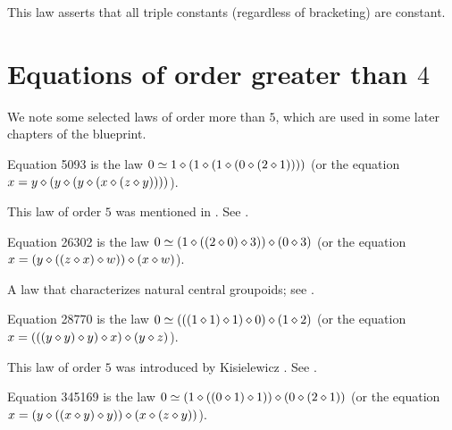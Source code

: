 This law asserts that all triple constants (regardless of bracketing) are constant.

\section{Equations of order greater than \texorpdfstring{$4$}{4}}

We note some selected laws of order more than $5$, which are used in some later chapters of the blueprint.

\begin{definition}[Equation 5093]
  \label{eq5093}\leanok
  Equation 5093 is the law $0  \simeq 1 \diamond (1 \diamond (1 \diamond (0 \diamond (2 \diamond 1))))$ (or the equation $x = y \diamond (y \diamond (y \diamond (x \diamond (z \diamond y))))$).
\end{definition}

This law of order $5$ was mentioned in \cite{Kisielewicz2}.  See .

\begin{definition}[Equation 26302]
  \label{eq26302}
  Equation 26302 is the law $0  \simeq (1 \diamond ((2 \diamond 0) \diamond 3)) \diamond (0 \diamond 3)$ (or the equation $x = (y \diamond ((z \diamond x) \diamond w)) \diamond (x \diamond w)$).
\end{definition}

A law that characterizes natural central groupoids; see .

\begin{definition}[Equation 28770]
  \label{eq28770}\leanok
  Equation 28770 is the law $0  \simeq  (((1 \diamond 1) \diamond 1) \diamond 0) \diamond (1 \diamond 2)$ (or the equation $x = (((y \diamond y) \diamond y) \diamond x) \diamond (y \diamond z)$).
\end{definition}

This law of order $5$ was introduced by Kisielewicz \cite{Kisielewicz}. See .

\begin{definition}[Equation 345169]
  \label{eq345169}
  Equation 345169 is the law $0  \simeq  (1 \diamond ((0 \diamond 1) \diamond 1)) \diamond (0 \diamond (2 \diamond 1))$ (or the equation $x = (y \diamond ((x \diamond y) \diamond y)) \diamond (x \diamond (z \diamond y))$).
\end{definition}

